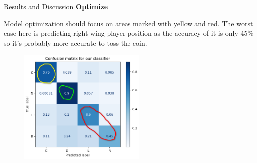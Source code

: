 \begin{frame}{Results and Discussion}
    \textbf{Optimize}\\
    \vspace{2em}
    
    Model optimization should focus on areas marked with yellow and red. The worst case here is predicting right wing player position as the accuracy of it is only 45\% so it's probably more accurate to toss the coin.
    
    \begin{figure}[H]
        \includegraphics[width=0.55\textwidth]{optimize}
    \end{figure}
\end{frame}
